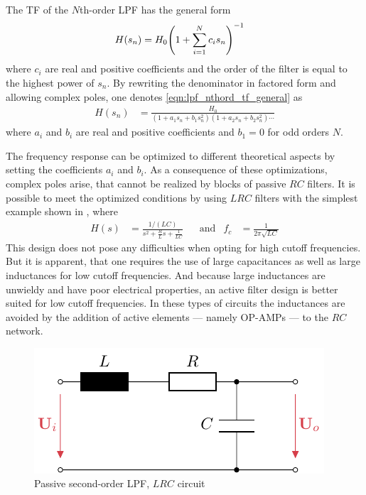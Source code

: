 The \ac{TF} of the $N$th-order \ac{LPF} has the general form
\begin{align}
  H(s_n) &= H_0 \pqty{1 + \sum\limits_{i=1}^N c_i s_n}^{-1} \label{eqn:lpf_nthord_tf_general}
\end{align}
where $c_i$ are real and positive coefficients and the order of the filter is equal to the highest power of $s_n$. By rewriting the denominator in factored form and allowing complex poles, one denotes \autoref{eqn:lpf_nthord_tf_general} as
\begin{align}
  H(s_n) &= \frac{H_0}{(1+a_1s_n+b_1s_n^2)(1+a_2s_n+b_2s_n^2)\cdots} \label{eqn:lpf_nthord_tf_poles}
\end{align}
where $a_i$ and $b_i$ are real and positive coefficients and $b_1=0$ for odd orders $N$.

The frequency response can be optimized to different theoretical aspects by setting the coefficients $a_i$ and $b_i$. As a consequence of these optimizations, complex poles arise, that cannot be realized by blocks of passive $RC$ filters. It is possible to meet the optimized conditions by using $LRC$ filters with the simplest example shown in , where
\begin{align}
  H(s) &= \frac{1/(LC)}{s^2+\frac{R}{L}s+\frac{1}{LC}} &&\text{and} &f_c &= \frac{1}{2\pi\sqrt{LC}}
\end{align}
This design does not pose any difficulties when opting for high cutoff frequencies. But it is apparent, that one requires the use of large capacitances as well as large inductances for low cutoff frequencies. And because large inductances are unwieldy and have poor electrical properties, an active filter design is better suited for low cutoff frequencies. In these types of circuits the inductances are avoided by the addition of active elements --- namely \ac{OP-AMP}s --- to the $RC$ network.

\begin{figure}[htb!]
  \centering
  \includegraphics[scale=1]{figures/electronics/lowpass/lp_passive_2ord/lp_passive_2ord}
  \caption[Passive second-order \ac{LPF}]{Passive second-order \ac{LPF}, $LRC$ circuit%
    \label{fig:lp_passive_2ord}}
\end{figure}


